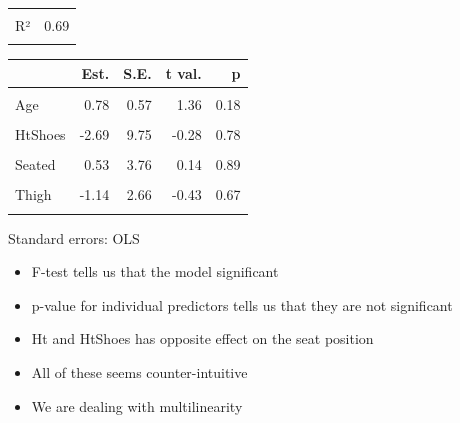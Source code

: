 \documentclass[
  ignorenonframetext,
]{beamer}
\begin{document}
\begin{frame}{}
\protect\hypertarget{section-7}{}
\begin{table}[!h]
\centering
\begin{tabular}{lr}
\toprule
\cellcolor{gray!6}{F(8,29)} & \cellcolor{gray!6}{7.94}\\
R² & 0.69\\
\cellcolor{gray!6}{Adj. R²} & \cellcolor{gray!6}{0.60}\\
\bottomrule
\end{tabular}
\end{table} \begin{table}[!h]
\centering
\begin{threeparttable}
\begin{tabular}{lrrrr}
\toprule
  & Est. & S.E. & t val. & p\\
\midrule
\cellcolor{gray!6}{(Intercept)} & \cellcolor{gray!6}{436.43} & \cellcolor{gray!6}{166.57} & \cellcolor{gray!6}{2.62} & \cellcolor{gray!6}{0.01}\\
Age & 0.78 & 0.57 & 1.36 & 0.18\\
\cellcolor{gray!6}{Weight} & \cellcolor{gray!6}{0.03} & \cellcolor{gray!6}{0.33} & \cellcolor{gray!6}{0.08} & \cellcolor{gray!6}{0.94}\\
HtShoes & -2.69 & 9.75 & -0.28 & 0.78\\
\cellcolor{gray!6}{Ht} & \cellcolor{gray!6}{0.60} & \cellcolor{gray!6}{10.13} & \cellcolor{gray!6}{0.06} & \cellcolor{gray!6}{0.95}\\
\addlinespace
Seated & 0.53 & 3.76 & 0.14 & 0.89\\
\cellcolor{gray!6}{Arm} & \cellcolor{gray!6}{-1.33} & \cellcolor{gray!6}{3.90} & \cellcolor{gray!6}{-0.34} & \cellcolor{gray!6}{0.74}\\
Thigh & -1.14 & 2.66 & -0.43 & 0.67\\
\cellcolor{gray!6}{Leg} & \cellcolor{gray!6}{-6.44} & \cellcolor{gray!6}{4.71} & \cellcolor{gray!6}{-1.37} & \cellcolor{gray!6}{0.18}\\
\bottomrule
\end{tabular}
\begin{tablenotes}
\item Standard errors: OLS
\end{tablenotes}
\end{threeparttable}
\end{table}
\end{frame}

\begin{frame}{}
\protect\hypertarget{section-8}{}
\begin{itemize}
\item
  F-test tells us that the model significant
\item
  p-value for individual predictors tells us that they are not
  significant
\item
  Ht and HtShoes has opposite effect on the seat position
\item
  All of these seems counter-intuitive
\item
  We are dealing with multilinearity
\end{itemize}
\end{frame}
\end{document}
